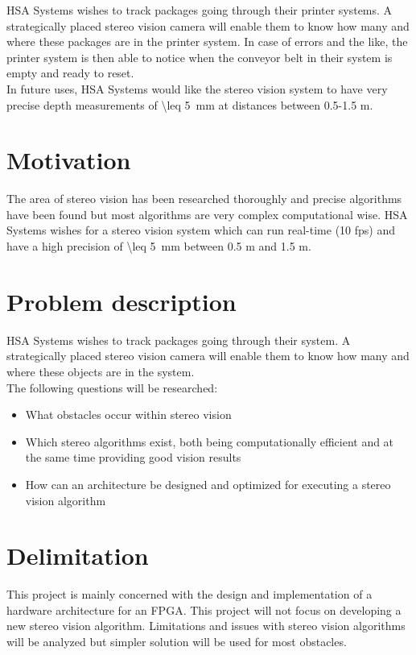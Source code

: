 HSA Systems wishes to track packages going through their printer systems. A strategically placed stereo vision camera will enable them to know how many and where these packages are in the printer system. In case of errors and the like, the printer system is then able to notice when the conveyor belt in their system is empty and ready to reset.\\

In future uses, HSA Systems would like the stereo vision system to have very precise depth measurements of \SI{\leq 5}{\milli\meter} at distances between 0.5-1.5 m.

\section{Motivation}\label{sec:intromotiv}
The area of stereo vision has been researched thoroughly and precise algorithms have been found but most algorithms are very complex computational wise. HSA Systems wishes for a stereo vision system which can run real-time (10 fps) and have a high precision of \SI{\leq 5}{\milli\meter} between 0.5 m and 1.5 m.

\section{Problem description}
HSA Systems wishes to track packages going through their system. A strategically placed stereo vision camera will enable them to know how many and where these objects are in the system. \\
The following questions will be researched:
\begin{itemize}
  \item What obstacles occur within stereo vision
  \item Which stereo algorithms exist, both being computationally efficient and at the same time providing good vision results
  \item How can an architecture be designed and optimized for executing a stereo vision algorithm
\end{itemize}

\section{Delimitation}
This project is mainly concerned with the design and implementation of a hardware architecture for an FPGA. This project will not focus on developing a new stereo vision algorithm. Limitations and issues with stereo vision algorithms will be analyzed but simpler solution will be used for most obstacles.

